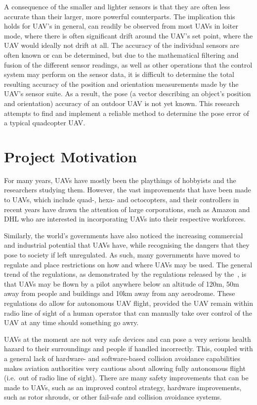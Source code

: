 A consequence of the smaller and lighter sensors is that they are often less accurate than their larger, more powerful counterparts. The implication this holds for UAV's in general, can readily be observed from most UAVs in loiter mode, where there is often significant drift around the UAV's set point, where the UAV would ideally not drift at all. The accuracy of the individual sensors are often known or can be determined, but due to the mathematical filtering and fusion of the different sensor readings, as well as other operations that the control system may perform on the sensor data, it is difficult to determine the total resulting accuracy of the position and orientation measurements made by the UAV's sensor suite. As a result, the pose (a vector describing an object's position and orientation) accuracy of an outdoor UAV is not yet known. This research attempts to find and implement a reliable method to determine the pose error of a typical quadcopter UAV.\@  

\section{Project Motivation}

For many years, UAVs have mostly been the playthings of hobbyists and the researchers studying them. However, the vast improvements that have been made to UAVs, which include quad-, hexa- and octocopters, and their controllers in recent years have drawn the attention of large corporations, such as Amazon and DHL who are interested in incorporating UAVs into their respective workforces. 

Similarly, the world's governments have also noticed the increasing commercial and industrial potential that UAVs have, while recognising the dangers that they pose to society if left unregulated. As such, many governments have moved to regulate and place restrictions on how and where UAVs may be used. The general trend of the regulations, as demonstrated by the regulations released by the~\cite{sacaa-drone-regs}, is that UAVs may be flown by a pilot anywhere below an altitude of 120m, 50m away from people and buildings and 10km away from any aerodrome. These regulations do allow for autonomous UAV flight, provided the UAV remain within radio line of sight of a human operator that can manually take over control of the UAV at any time should something go awry. 

UAVs at the moment are not very safe devices and can pose a very serious health hazard to their surroundings and people if handled incorrectly. This, coupled with a general lack of hardware- and software-based collision avoidance capabilities makes aviation authorities very cautious about allowing fully autonomous flight (i.e.\ out of radio line of sight). There are many safety improvements that can be made to UAVs, such as an improved control strategy, hardware improvements, such as rotor shrouds, or other fail-safe and collision avoidance systems. 

